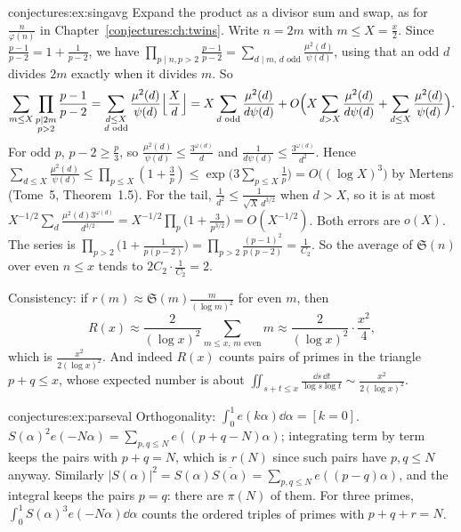 \begin{solution}{conjectures:ex:singavg}
\idea Expand the product as a divisor sum and swap, as for $\frac n{\varphi(n)}$ in Chapter~\ref{conjectures:ch:twins}.
\writeup Write $n=2m$ with $m\le X=\frac x2$. Since $\frac{p-1}{p-2}=1+\frac1{p-2}$, we have $\prod_{p\mid n,p>2}\frac{p-1}{p-2}=\sum_{d\mid m,\,d\text{ odd}}\frac{\mu^2(d)}{\psi(d)}$,
using that an odd $d$ divides $2m$ exactly when it divides $m$. So
\[
\sum_{m\le X}\prod_{\substack{p\mid2m\\p>2}}\frac{p-1}{p-2}=\sum_{\substack{d\le X\\d\text{ odd}}}\frac{\mu^2(d)}{\psi(d)}\Bigl\lfloor\frac Xd\Bigr\rfloor=X\sum_{d\text{ odd}}\frac{\mu^2(d)}{d\psi(d)}+O\Bigl(X\sum_{d>X}\frac{\mu^2(d)}{d\psi(d)}+\sum_{d\le X}\frac{\mu^2(d)}{\psi(d)}\Bigr).
\]
For odd $p$, $p-2\ge\frac p3$, so $\frac{\mu^2(d)}{\psi(d)}\le\frac{3^{\omega(d)}}d$ and $\frac1{d\psi(d)}\le\frac{3^{\omega(d)}}{d^2}$. Hence
$\sum_{d\le X}\frac{\mu^2(d)}{\psi(d)}\le\prod_{p\le X}(1+\frac3p)\le\exp\bigl(3\sum_{p\le X}\frac1p\bigr)=O\bigl((\log X)^3\bigr)$ by Mertens (Tome~5,
Theorem~1.5). For the tail, $\frac1{d^2}\le\frac1{\sqrt X\,d^{3/2}}$ when $d>X$, so it is at most
$X^{-1/2}\sum_d\frac{\mu^2(d)3^{\omega(d)}}{d^{3/2}}=X^{-1/2}\prod_p\bigl(1+\frac3{p^{3/2}}\bigr)=O(X^{-1/2})$. Both errors are $o(X)$. The series is
$\prod_{p>2}\bigl(1+\frac1{p(p-2)}\bigr)=\prod_{p>2}\frac{(p-1)^2}{p(p-2)}=\frac1{C_2}$. So the average of $\mathfrak S(n)$ over even $n\le x$ tends to
$2C_2\cdot\frac1{C_2}=2$.

Consistency: if $r(m)\approx\mathfrak S(m)\frac m{(\log m)^2}$ for even $m$, then
\[
R(x)\approx\frac2{(\log x)^2}\sum_{m\le x,\,m\text{ even}}m\approx\frac2{(\log x)^2}\cdot\frac{x^2}4,
\]
which is $\frac{x^2}{2(\log x)^2}$. And indeed $R(x)$ counts pairs of primes in the triangle $p+q\le x$, whose expected number is about
$\iint_{s+t\le x}\frac{\dd s\,\dd t}{\log s\log t}\sim\frac{x^2}{2(\log x)^2}$.
\end{solution}

\begin{solution}{conjectures:ex:parseval}
\idea Orthogonality: $\int_0^1e(k\alpha)\dd\alpha=[k=0]$.
\writeup $S(\alpha)^2e(-N\alpha)=\sum_{p,q\le N}e((p+q-N)\alpha)$; integrating term by term keeps the pairs with $p+q=N$, which is $r(N)$ since such pairs have
$p,q\le N$ anyway. Similarly $|S(\alpha)|^2=S(\alpha)\overline{S(\alpha)}=\sum_{p,q\le N}e((p-q)\alpha)$, and the integral keeps the pairs $p=q$: there are
$\pi(N)$ of them. For three primes, $\int_0^1S(\alpha)^3e(-N\alpha)\dd\alpha$ counts the ordered triples of primes with $p+q+r=N$.
\end{solution}

